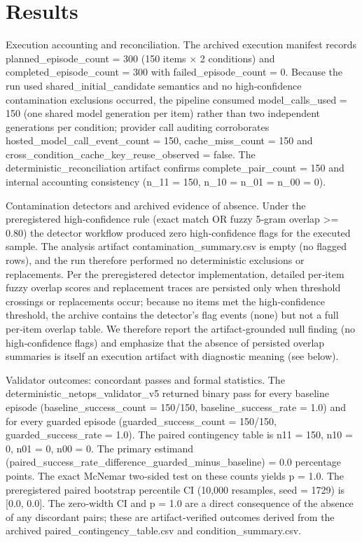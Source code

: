\documentclass[conference]{IEEEtran}
\begin{document}
\section{Results}
Execution accounting and reconciliation. The archived execution manifest records planned\_episode\_count = 300 (150 items \ensuremath{\times} 2 conditions) and completed\_episode\_count = 300 with failed\_episode\_count = 0. Because the run used shared\_initial\_candidate semantics and no high‑confidence contamination exclusions occurred, the pipeline consumed model\_calls\_used = 150 (one shared model generation per item) rather than two independent generations per condition; provider call auditing corroborates hosted\_model\_call\_event\_count = 150, cache\_miss\_count = 150 and cross\_condition\_cache\_key\_reuse\_observed = false. The deterministic\_reconciliation artifact confirms complete\_pair\_count = 150 and internal accounting consistency (n\_11 = 150, n\_10 = n\_01 = n\_00 = 0).

Contamination detectors and archived evidence of absence. Under the preregistered high‑confidence rule (exact match OR fuzzy 5‑gram overlap >= 0.80) the detector workflow produced zero high‑confidence flags for the executed sample. The analysis artifact contamination\_summary.csv is empty (no flagged rows), and the run therefore performed no deterministic exclusions or replacements. Per the preregistered detector implementation, detailed per‑item fuzzy overlap scores and replacement traces are persisted only when threshold crossings or replacements occur; because no items met the high‑confidence threshold, the archive contains the detector's flag events (none) but not a full per‑item overlap table. We therefore report the artifact‑grounded null finding (no high‑confidence flags) and emphasize that the absence of persisted overlap summaries is itself an execution artifact with diagnostic meaning (see below).

Validator outcomes: concordant passes and formal statistics. The deterministic\_netops\_validator\_v5 returned binary pass for every baseline episode (baseline\_success\_count = 150/150, baseline\_success\_rate = 1.0) and for every guarded episode (guarded\_success\_count = 150/150, guarded\_success\_rate = 1.0). The paired contingency table is n11 = 150, n10 = 0, n01 = 0, n00 = 0. The primary estimand (paired\_success\_rate\_difference\_guarded\_minus\_baseline) = 0.0 percentage points. The exact McNemar two‑sided test on these counts yields p = 1.0. The preregistered paired bootstrap percentile CI (10,000 resamples, seed = 1729) is [0.0, 0.0]. The zero‑width CI and p = 1.0 are a direct consequence of the absence of any discordant pairs; these are artifact‑verified outcomes derived from the archived paired\_contingency\_table.csv and condition\_summary.csv.
\end{document}
